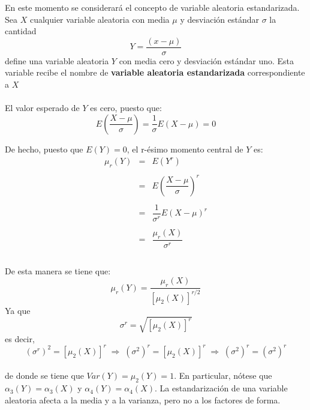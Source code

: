 En este momento se considerará el concepto de variable aleatoria estandarizada. Sea $X$ cualquier variable aleatoria con media $\mu$ y desviación estándar $\sigma$ la cantidad 
$$Y=\dfrac{(x-\mu)}{\sigma}$$
define una variable aleatoria $Y$ con media cero y desviación estándar uno. Esta variable recibe el nombre de \textbf{variable aleatoria estandarizada} correspondiente a $X$\\\\
El valor esperado de $Y$ es cero, puesto que:
$$E\left(\dfrac{X-\mu}{\sigma}\right) = \dfrac{1}{\sigma} E(X-\mu) = 0$$

De hecho, puesto que $E(Y) = 0$, el r-ésimo momento central de $Y$ es:
$$\begin{array}{rcl}
    \mu_r(Y)&=&E(Y^r)\\\\
	    &=&E\left(\dfrac{X-\mu}{\sigma}\right)^r\\\\
	    &=&\dfrac{1}{\sigma^r} E(X-\mu)^r\\\\
	    &=&\dfrac{\mu_r (X)}{\sigma^r}\\\\
\end{array}$$
 
De esta manera se tiene que:
$$\mu_r(Y) = \dfrac{\mu_r(X)}{\left[\mu_2(X)\right]^{r/2}}$$
Ya que $$\sigma^r = \sqrt{\left[\mu_2(X)\right]^r}$$
es decir, $$\left(\sigma^r\right)^2 = \left[\mu_2(X)\right]^r\; \Longrightarrow \; (\sigma^2)^r = \left[\mu_2(X)\right]^r \; \Longrightarrow \; (\sigma^2)^r = (\sigma^2)^r $$\\
de donde se tiene que $Var(Y) = \mu_2(Y) = 1$. En particular, nótese que $\alpha_3(Y) = \alpha_3(X)$ y $\alpha_4(Y) = \alpha_4(X)$. La estandarización de una variable aleatoria afecta a la media y a la varianza, pero no a los factores de forma.


